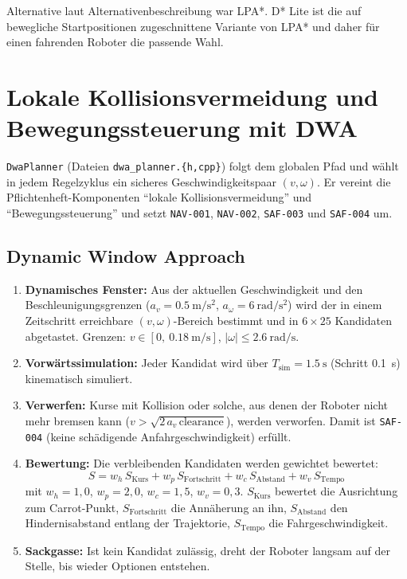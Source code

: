 \documentclass[
  a4paper,
  12pt,
  DIV=12,        %
  parskip=half,  %
  headings=small %
]{scrartcl}
\theoremstyle{definition}
\providecommand{\tightlist}{%
  \setlength{\itemsep}{0pt}\setlength{\parskip}{0pt}}
\theoremstyle{definition}
\begin{document}
Alternative laut Alternativenbeschreibung war LPA*. D* Lite ist die auf
bewegliche Startpositionen zugeschnittene Variante von LPA* und daher
für einen fahrenden Roboter die passende Wahl.

\section{Lokale Kollisionsvermeidung und Bewegungssteuerung mit DWA}\label{dwa}

\texttt{DwaPlanner} (Dateien \texttt{dwa\_planner.\{h,cpp\}}) folgt dem
globalen Pfad und wählt in jedem Regelzyklus ein sicheres
Geschwindigkeitspaar $(v, \omega)$. Er vereint die
Pflichtenheft-Komponenten \enquote{lokale Kollisionsvermeidung} und
\enquote{Bewegungssteuerung} und setzt \texttt{NAV-001}, \texttt{NAV-002},
\texttt{SAF-003} und \texttt{SAF-004} um.

\subsection{Dynamic Window Approach}\label{dwa-verfahren}

\begin{enumerate}
\tightlist
\item
  \textbf{Dynamisches Fenster:} Aus der aktuellen Geschwindigkeit und den
  Beschleunigungsgrenzen ($a_v = \SI{0.5}{\meter\per\second\squared}$,
  $a_\omega = \SI{6}{\radian\per\second\squared}$) wird der in einem
  Zeitschritt erreichbare $(v, \omega)$-Bereich bestimmt und in
  $6 \times 25$ Kandidaten abgetastet. Grenzen:
  $v \in [0,\ \SI{0.18}{\meter\per\second}]$,
  $|\omega| \le \SI{2.6}{\radian\per\second}$.
\item
  \textbf{Vorwärtssimulation:} Jeder Kandidat wird über
  $T_\mathrm{sim} = \SI{1.5}{\second}$ (Schritt \SI{0.1}{\second})
  kinematisch simuliert.
\item
  \textbf{Verwerfen:} Kurse mit Kollision oder solche, aus denen
  der Roboter nicht mehr bremsen kann
  ($v > \sqrt{2\,a_v\,\text{clearance}}$), werden verworfen. Damit ist
  \texttt{SAF-004} (keine schädigende Anfahrgeschwindigkeit) erfüllt.
\item
  \textbf{Bewertung:} Die verbleibenden Kandidaten werden gewichtet
  bewertet:
  \[
  S = w_h\,S_\mathrm{Kurs} + w_p\,S_\mathrm{Fortschritt}
    + w_c\,S_\mathrm{Abstand} + w_v\,S_\mathrm{Tempo}
  \]
  mit $w_h = 1{,}0$, $w_p = 2{,}0$, $w_c = 1{,}5$, $w_v = 0{,}3$.
  $S_\mathrm{Kurs}$ bewertet die Ausrichtung zum Carrot-Punkt,
  $S_\mathrm{Fortschritt}$ die Annäherung an ihn, $S_\mathrm{Abstand}$
  den Hindernisabstand entlang der Trajektorie, $S_\mathrm{Tempo}$ die
  Fahrgeschwindigkeit.
\item
  \textbf{Sackgasse:} Ist kein Kandidat zulässig, dreht der Roboter
  langsam auf der Stelle, bis wieder Optionen entstehen.
\end{enumerate}
\end{document}
